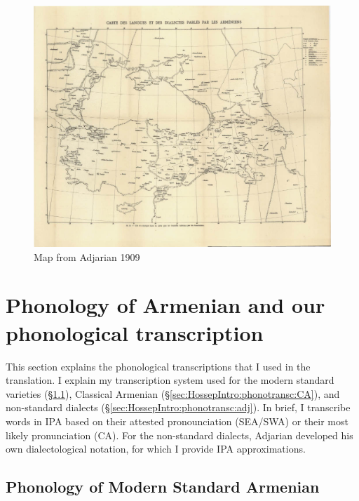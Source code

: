 \begin{landscape}
	\begin{figure}
	\caption{Map from Adjarian 1909}
\label{map:Adjarian1909}
		\centering
		\includegraphics[height=1\textheight]{images/map1909.jpg}
		
	\end{figure}
\end{landscape}


  
 \section{Phonology of Armenian and our phonological transcription}\label{sec:HossepIntro:phonotransc}

This section explains the phonological transcriptions that I used in the translation. I explain my transcription system used for the modern standard varieties (\S\ref{sec:HossepIntro:phonotransc:modern}), Classical Armenian (\S\ref{sec:HossepIntro:phonotransc:CA}),  and non-standard dialects (\S\ref{sec:HossepIntro:phonotransc:adj}). In brief, I transcribe words in IPA based on their attested pronounciation (SEA/SWA)  or their most likely pronunciation (CA). For the non-standard dialects, Adjarian developed his own dialectological notation, for which I provide IPA approximations. 
\subsection{Phonology of Modern Standard Armenian}\label{sec:HossepIntro:phonotransc:modern}

